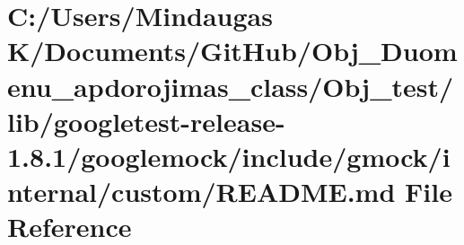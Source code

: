 \hypertarget{_obj__test_2lib_2googletest-release-1_88_81_2googlemock_2include_2gmock_2internal_2custom_2_r_e_a_d_m_e_8md}{}\section{C\+:/\+Users/\+Mindaugas K/\+Documents/\+Git\+Hub/\+Obj\+\_\+\+Duomenu\+\_\+apdorojimas\+\_\+class/\+Obj\+\_\+test/lib/googletest-\/release-\/1.8.1/googlemock/include/gmock/internal/custom/\+R\+E\+A\+D\+ME.md File Reference}
\label{_obj__test_2lib_2googletest-release-1_88_81_2googlemock_2include_2gmock_2internal_2custom_2_r_e_a_d_m_e_8md}
